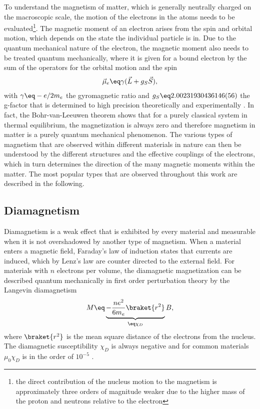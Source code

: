 \documentclass[\main/dresen_thesis.tex]{subfiles}
\begin{document}
    To understand the magnetism of matter, which is generally neutrally charged on the macroscopic scale, the motion of the electrons in the atoms needs to be evaluated\footnote{the direct contribution of the nucleus motion to the magnetism is approximately three orders of magnitude weaker due to the higher mass of the proton and neutrons relative to the electron}.
    The magnetic moment of an electron arises from the spin and orbital motion, which depends on the state the individual particle is in.
    Due to the quantum mechanical nature of the electron, the magnetic moment also needs to be treated quantum mechanically, where it is given for a bound electron by the sum of the operators for the orbital motion and the spin \cite{Coey_2010_Magne}
    \begin{align}
      \vec{\mu}_e \eq \gamma (\vec{L} + g_S \vec{S}),
    \end{align}
    with $\gamma \eq -e/2m_e$ the gyromagnetic ratio and $g_S \eq 2.00231930436146(56)$ the g-factor that is determined to high precision theoretically and experimentally \cite{Aoyama_2012_Tenth, Hanneke_2011_Cavit}.
    In fact, the Bohr-van-Leeuwen theorem shows that for a purely classical system in thermal equilibrium, the magnetization is always zero and therefore magnetism in matter is a purely quantum mechanical phenomenon.
    The various types of magnetism that are observed within different materials in nature can then be understood by the different structures and the effective couplings of the electrons, which in turn determines the direction of the many magnetic moments within the matter.
    The most popular types that are observed throughout this work are described in the following.

    \subsection{Diamagnetism}
      Diamagnetism is a weak effect that is exhibited by every material and measurable when it is not overshadowed by another type of magnetism.
      When a material enters a magnetic field, Faraday's law of induction states that currents are induced, which by Lenz's law are counter directed to the external field.
      For materials with $n$ electrons per volume, the diamagnetic magnetization can be described quantum mechanically in first order perturbation theory by the Langevin diamagnetism \cite{Blundell_2001_Magne}
      \begin{align}
        M \eq \underbrace{- \frac{n e^2}{6 m_e} \braket{r^2}}_{\eq \chi_D} B,
      \end{align}
      where $\braket{r^2}$ is the mean square distance of the electrons from the nucleus.
      The diamagnetic susceptibility $\chi_D$ is always negative and for common materials $\mu_0 \chi_D$ is in the order of $10^{-5}$ \cite{Lide_2004_Handb}.
\end{document}
